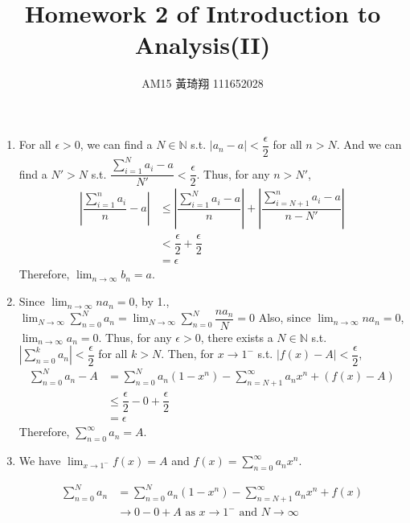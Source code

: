\documentclass[12pt]{article}
\title{Homework 2 of Introduction to Analysis(II)}
\author{AM15 黃琦翔 111652028}
\begin{document}
\maketitle
\begin{enumerate}
    \item For all $\epsilon > 0$, we can find a $N \in \mathbb{N}$ s.t. $|a_n - a| < \dfrac{\epsilon}{2}$ for all $n > N$.
    And we can find a $N' > N$ s.t. $\dfrac{\displaystyle\sum_{i=1}^{N} a_i - a}{N'} < \dfrac{\epsilon}{2}$.
    Thus, for any $n > N'$, \begin{align*}
        |\dfrac{\sum_{i=1}^{n} a_i }{n} - a| &\leq |\dfrac{\sum_{i=1}^{N} a_i - a}{n}| + |\dfrac{\sum_{i=N+1}^{n} a_i - a}{n - N'}|\\
        &< \dfrac{\epsilon}{2} + \dfrac{\epsilon}{2}\\
        &= \epsilon
    \end{align*}
    Therefore, $\displaystyle\lim_{n\to\infty} b_n = a$.

    \item Since $\displaystyle\lim_{n\to\infty} na_n = 0$, by 1., $\displaystyle\lim_{N\to\infty} \displaystyle\sum_{n=0}^{N} a_n = \displaystyle\lim_{N\to\infty} \displaystyle\sum_{n=0}^{N} \dfrac{na_n}{N} = 0$
    Also, since $\displaystyle\lim_{n\to\infty} na_n = 0$, $\displaystyle\lim_{n\to\infty} a_n = 0$.
    Thus, for any $\epsilon > 0$,  there exists a $N \in \mathbb{N}$ s.t. $|\displaystyle\sum_{n=0}^{k} a_n| < \dfrac{\epsilon}{2}$ for all $k > N$.
    Then, for $x \to 1^{-}$ s.t. $|f(x) - A| < \dfrac{\epsilon}{2}$, \begin{align*}
        \sum_{n=0}^{N} a_n - A &= \sum_{n=0}^{N} a_n(1-x^n) - \sum_{n=N+1}^{\infty} a_n x^n + (f(x) - A)\\
        &\leq \dfrac{\epsilon}{2} - 0 + \dfrac{\epsilon}{2}\\
        &= \epsilon
    \end{align*}
    Therefore, $\displaystyle\sum_{n=0}^{\infty} a_n = A$.

    \newpage
    \item We have $\displaystyle\lim_{x\to 1^{-}} f(x) = A$ and $f(x) = \displaystyle\sum_{n=0}^{\infty} a_n x^n$.
    
    \begin{align*}
        \sum_{n=0}^{N} a_n &= \sum_{n=0}^{N} a_n(1 - x^n) - \sum_{n=N+1}^{\infty} a_nx^{n} + f(x)\\
        &\to 0 - 0 + A\text{ as } x \to 1^-\text{ and } N \to \infty
    \end{align*}


\end{enumerate}
\end{document}
